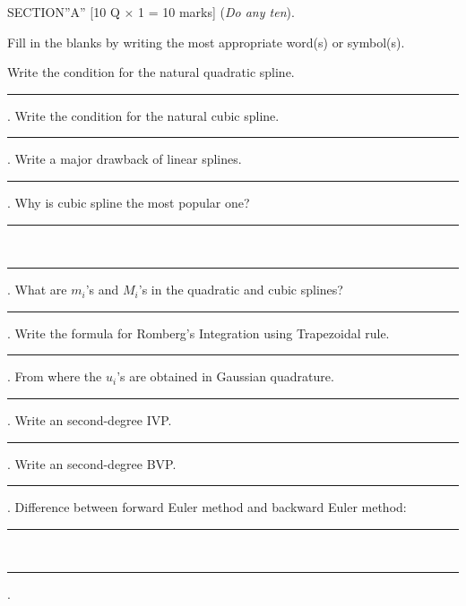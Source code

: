 \documentclass[12pt]{exam}
\begin{document}
\begin{center}
  SECTION''A'' \hspace{5mm} [10 Q \(\times\) 1 = 10 marks] (\textit{Do any ten}).
\end{center}
Fill in the blanks by writing the most appropriate word(s) or symbol(s).
\begin{questions}
  \question Write the condition for the natural quadratic spline. \rule{7cm}{0.15mm}.
\vspace{2mm}
  \question Write the condition for the natural cubic spline. \rule{7cm}{0.15mm}.
\vspace{2mm}
  \question Write a major drawback of linear splines. \rule{7cm}{0.15mm}.
\vspace{2mm}
  \question Why is cubic spline the most popular one? \rule{7cm}{0.15mm} \\[1mm]
  \rule{9cm}{0.15mm}.
\vspace{2mm}
  \question What are $m_i$'s and $M_i$'s in the quadratic and cubic splines? \rule{5cm}{0.15mm}.
\vspace{2mm}
  \question Write the formula for Romberg's Integration using Trapezoidal rule. \rule{4cm}{0.15mm}.
\vspace{2mm}
  \question From where the $u_i$'s are obtained in Gaussian quadrature. \rule{5cm}{0.15mm}.
\vspace{2mm}
  \question Write an second-degree IVP. \rule{9cm}{0.15mm}.
\vspace{2mm}
\question Write an second-degree BVP. \rule{9cm}{0.15mm}.
\vspace{2mm}
  \question Difference between forward Euler method and backward Euler method: \rule{2cm}{0.15mm} \\[1mm]
    \rule{9cm}{0.15mm}.

\end{questions}
\end{document}
